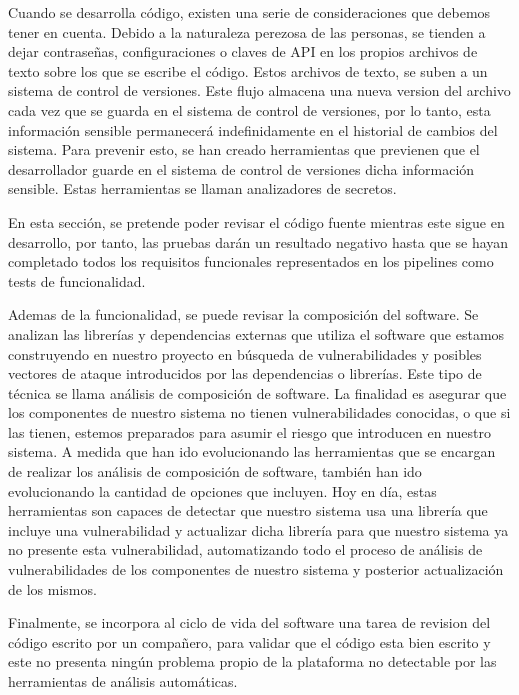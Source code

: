 \documentclass[12pt]{report} %
\begin{document}
Cuando se desarrolla código, existen una serie de consideraciones que debemos
tener en cuenta.
Debido a la naturaleza perezosa de las personas, se tienden a dejar contraseñas,
configuraciones o claves de \gls{API} en los propios archivos de texto sobre los
que se escribe el código.
Estos archivos de texto, se suben a un sistema de control de versiones.
Este flujo almacena una nueva version del archivo cada vez que se guarda en el
sistema de control de versiones,
por lo tanto, esta información sensible permanecerá indefinidamente en el historial de
cambios del sistema.
Para prevenir esto, se han creado herramientas que previenen que el desarrollador
guarde en el sistema de control de versiones dicha información sensible.
Estas herramientas se llaman analizadores de secretos.


En esta sección, se pretende poder revisar el código fuente mientras este sigue
en desarrollo, por tanto, las pruebas darán un resultado negativo hasta que se
hayan completado todos los requisitos funcionales representados en los
pipelines como tests de funcionalidad.

Ademas de la funcionalidad, se puede revisar la composición del software.
Se analizan las librerías y dependencias externas que utiliza el software que
estamos construyendo en nuestro proyecto en búsqueda de vulnerabilidades y 
posibles vectores de ataque introducidos por las dependencias o librerías.
Este tipo de técnica se llama análisis de composición de software.
La finalidad es asegurar que los componentes de nuestro sistema no tienen
vulnerabilidades conocidas, o que si las tienen, estemos preparados para asumir
el riesgo que introducen en nuestro sistema.
A medida que han ido evolucionando las herramientas que se encargan de realizar
los análisis de composición de software, también han ido evolucionando la
cantidad de opciones que incluyen.
Hoy en día, estas herramientas son capaces de detectar que nuestro sistema usa
una librería que incluye una vulnerabilidad y actualizar dicha
librería para que nuestro sistema ya no presente esta vulnerabilidad,
automatizando todo el proceso de análisis de vulnerabilidades de los
componentes de nuestro sistema y posterior actualización de los mismos.


Finalmente, se incorpora al ciclo de vida del software una tarea de revision del
código escrito por un compañero, para validar que el código esta bien escrito y
este no presenta ningún problema propio de la plataforma no detectable por las 
herramientas de análisis automáticas.
\end{document}
